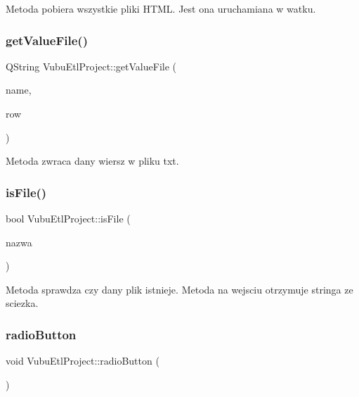 Metoda pobiera wszystkie pliki H\+T\+ML. Jest ona uruchamiana w watku. 

\mbox{\label{class_vubu_etl_project_aa98aca375afb86994b80a5b88e113a8d}} 
\subsubsection{\texorpdfstring{get\+Value\+File()}{getValueFile()}}
{\footnotesize\ttfamily Q\+String Vubu\+Etl\+Project\+::get\+Value\+File (\begin{DoxyParamCaption}\item[{string}]{name,  }\item[{int}]{row }\end{DoxyParamCaption})}



Metoda zwraca dany wiersz w pliku txt. 

\mbox{\label{class_vubu_etl_project_a61d213ee394551e86a1626a86f8e9aaf}} 
\subsubsection{\texorpdfstring{is\+File()}{isFile()}}
{\footnotesize\ttfamily bool Vubu\+Etl\+Project\+::is\+File (\begin{DoxyParamCaption}\item[{Q\+String}]{nazwa }\end{DoxyParamCaption})\hspace{0.3cm}{\ttfamily [private]}}

Metoda sprawdza czy dany plik istnieje. Metoda na wejsciu otrzymuje stringa ze sciezka. \mbox{\label{class_vubu_etl_project_af2e129dffbe49b95921927226f7f3660}} 
\subsubsection{\texorpdfstring{radio\+Button}{radioButton}}
{\footnotesize\ttfamily void Vubu\+Etl\+Project\+::radio\+Button (\begin{DoxyParamCaption}{ }\end{DoxyParamCaption})\hspace{0.3cm}{\ttfamily [slot]}}



